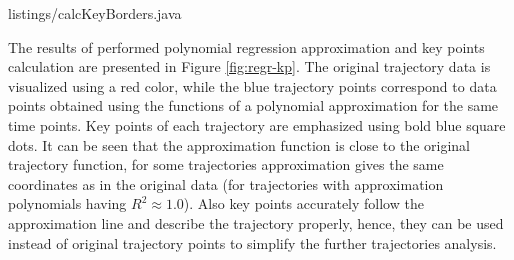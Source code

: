 {listings/calcKeyBorders.java}

The results of performed polynomial regression approximation and key points calculation are presented in Figure \ref{fig:regr-kp}. The original trajectory data is visualized using a red color, while the blue trajectory points correspond to data points obtained using the functions of a polynomial approximation for the same time points. Key points of each trajectory are emphasized using bold blue square dots. It can be seen that the approximation function is close to the original trajectory function, for some trajectories approximation gives the same coordinates as in the original data (for trajectories with approximation polynomials having $R^2 \approx 1.0$). Also key points accurately follow the approximation line and describe the trajectory properly, hence, they can be used instead of original trajectory points to simplify the further trajectories analysis. 

